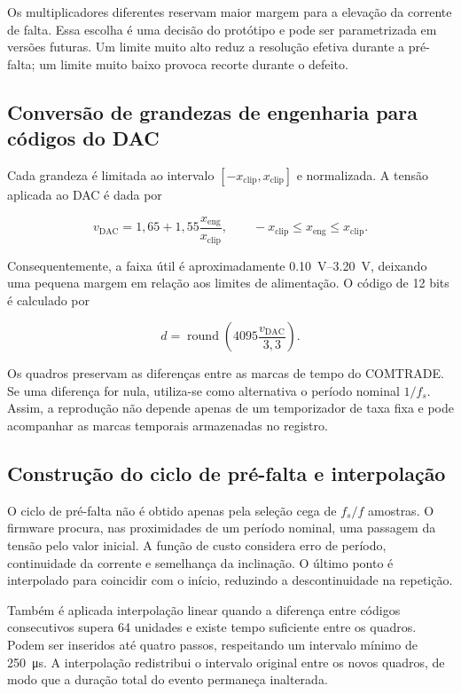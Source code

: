 Os multiplicadores diferentes reservam maior margem para a elevação da corrente de falta. Essa escolha é uma decisão do protótipo e pode ser parametrizada em versões futuras. Um limite muito alto reduz a resolução efetiva durante a pré-falta; um limite muito baixo provoca recorte durante o defeito.

\subsection{Conversão de grandezas de engenharia para códigos do DAC}

Cada grandeza é limitada ao intervalo $[-x_{\mathrm{clip}},x_{\mathrm{clip}}]$ e normalizada. A tensão aplicada ao DAC é dada por

\begin{equation}
  v_{\mathrm{DAC}}=1{,}65+1{,}55\frac{x_{\mathrm{eng}}}{x_{\mathrm{clip}}},
  \qquad -x_{\mathrm{clip}}\leq x_{\mathrm{eng}}\leq x_{\mathrm{clip}}.
  \label{eq:mapeamento-dac}
\end{equation}

Consequentemente, a faixa útil é aproximadamente \SIrange{0,10}{3,20}{\volt}, deixando uma pequena margem em relação aos limites de alimentação. O código de 12 bits é calculado por

\begin{equation}
  d=\operatorname{round}\left(4095\frac{v_{\mathrm{DAC}}}{3{,}3}\right).
\end{equation}

Os quadros preservam as diferenças entre as marcas de tempo do COMTRADE. Se uma diferença for nula, utiliza-se como alternativa o período nominal $1/f_s$. Assim, a reprodução não depende apenas de um temporizador de taxa fixa e pode acompanhar as marcas temporais armazenadas no registro.

\subsection{Construção do ciclo de pré-falta e interpolação}

O ciclo de pré-falta não é obtido apenas pela seleção cega de $f_s/f$ amostras. O firmware procura, nas proximidades de um período nominal, uma passagem da tensão pelo valor inicial. A função de custo considera erro de período, continuidade da corrente e semelhança da inclinação. O último ponto é interpolado para coincidir com o início, reduzindo a descontinuidade na repetição.

Também é aplicada interpolação linear quando a diferença entre códigos consecutivos supera 64 unidades e existe tempo suficiente entre os quadros. Podem ser inseridos até quatro passos, respeitando um intervalo mínimo de \SI{250}{\micro\second}. A interpolação redistribui o intervalo original entre os novos quadros, de modo que a duração total do evento permaneça inalterada.


